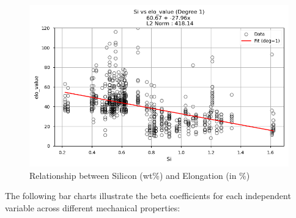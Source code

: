 \documentclass[10pt]{article}
\begin{document}
\begin{figure}[H]
    \centering
    \includegraphics[width=\imagewidthone\textwidth]{figures/03_leastsq/Si_vs_elo_value_deg1.png}
    \caption{Relationship between Silicon (wt\%) and Elongation (in \%)}
\end{figure}

The following bar charts illustrate the beta coefficients for each independent variable across different mechanical properties:
\end{document}

